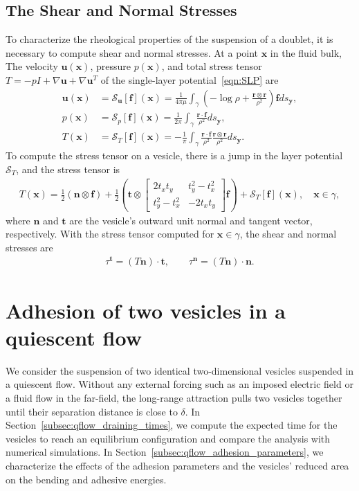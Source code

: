 \documentclass[prf,superscriptaddress,showpacs]{revtex4-1}
\newcommand{\ff}{\mathbf{f}}
\newcommand{\nn}{\mathbf{n}}
\renewcommand{\tt}{\mathbf{t}}
\newcommand{\rr}{\mathbf{r}}
\renewcommand{\SS}{\mathcal{S}}
\newcommand{\uu}{\mathbf{u}}
\newcommand{\xx}{\mathbf{x}}
\newcommand{\yy}{\mathbf{y}}
\begin{document}
\subsection{The Shear and Normal Stresses}
To characterize the rheological properties of the suspension of a
doublet, it is necessary to compute shear and normal stresses.  At a
point $\xx$ in the fluid bulk, The velocity $\uu(\xx)$, pressure
$p(\xx)$, and total stress tensor $T = - p I + \nabla \uu + \nabla
\uu^T$ of the single-layer potential~\eqref{eqn:SLP} are
\begin{align*}
  \uu(\xx) &= \SS_\uu[\ff](\xx) = \frac{1}{4\pi\mu}\int_{\gamma} \left( 
    -\log \rho + \frac{\rr \otimes \rr}{\rho^2} \right) 
    \ff ds_\yy, \\
    p(\xx) &= \SS_p[\ff](\xx) = \frac{1}{2\pi} \int_{\gamma} 
    \frac{\rr \cdot \ff}{\rho^2} ds_\yy, \\
    T(\xx) &= \SS_T[\ff](\xx) = -\frac{1}{\pi}\int_{\gamma}
      \frac{\rr \cdot \ff}{\rho^2} 
      \frac{\rr \otimes \rr}{\rho^2} ds_\yy.
\end{align*}
To compute the stress tensor on a vesicle, there is a jump in the layer
potential $\SS_T$, and the stress tensor is
\begin{align*}
  T(\xx) = \frac{1}{2}(\nn \otimes \ff) + \frac{1}{2} \left(
    \tt \otimes \left[
    \begin{array}{cc}
      2 t_x t_y & t_y^2 - t_x^2 \\
      t_y^2 - t_x^2 & -2 t_x t_y
    \end{array}
    \right] \ff \right) + 
  \SS_T[\ff](\xx), \quad \xx \in \gamma,
\end{align*}
where $\nn$ and $\tt$ are the vesicle's outward unit normal and tangent
vector, respectively.  With the stress tensor computed for $\xx \in
\gamma$, the shear and normal stresses are
\begin{align*}
  \tau^\tt = (T \nn) \cdot \tt, \qquad
  \tau^\nn = (T \nn) \cdot \nn.
\end{align*}


\section{Adhesion of two vesicles in a quiescent flow} 
\label{sec:qflow} 
We consider the suspension of two identical two-dimensional vesicles
suspended in a quiescent flow.  Without any external forcing such as an imposed
electric field or a fluid flow in the far-field, the long-range
attraction pulls two vesicles together until their separation distance
is close to $\delta$.  In Section~\ref{subsec:qflow_draining_times}, we
compute the expected time for the vesicles to reach an equilibrium
configuration and compare the analysis with numerical simulations.  In
Section~\ref{subsec:qflow_adhesion_parameters}, we characterize the
effects of the adhesion parameters and the vesicles' reduced area on the
bending and adhesive energies.
\end{document}
